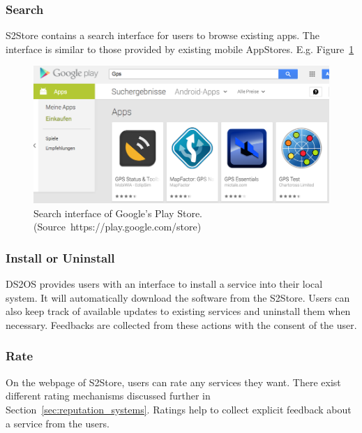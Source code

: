 \subsubsection{Search}

S2Store contains a search interface for users to browse existing apps. The interface is similar to those provided by existing mobile AppStores. E.g. Figure~\ref{fig:search-interface-play-store}

\begin{figure}[!htb]
  \centering
  \includegraphics[width=14cm]{figures/search-interface-play-store.png}
  \caption{Search interface of Google's Play Store. (Source~https://play.google.com/store)}
  \label{fig:search-interface-play-store}
\end{figure}


\subsubsection{Install or Uninstall}

DS2OS provides users with an interface to install a service into their local system. It will automatically download the software from the S2Store. Users can also keep track of available updates to existing services and uninstall them when necessary. Feedbacks are collected from these actions with the consent of the user. 

\subsubsection{Rate}

On the webpage of S2Store, users can rate any services they want. There exist different rating mechanisms discussed further in Section~\ref{sec:reputation_systems}. Ratings help to collect explicit feedback about a service from the users.

